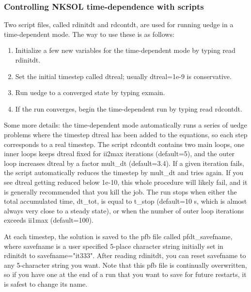 \documentclass [12pt]{article}
\begin{document}
\subsubsection{Controlling NKSOL time-dependence with scripts}
Two script files, called {\sf rdinitdt} and {\sf rdcontdt}, are used for 
running uedge in a time-dependent mode.  The way to use these is as follows:
%
\begin{enumerate}
 \item Initialize a few new variables for the time-dependent mode by typing 
       {\sf read rdinitdt}.
 \item Set the initial timestep called {\sf dtreal}; usually {\sf dtreal=1e-9}
       is conservative.
 \item Run uedge to a converged state by typing {\sf exmain}.
 \item If the run converges, begin the time-dependent run by typing 
       {\sf read rdcontdt}.
\end{enumerate}

Some more details: the time-dependent mode automatically runs a series of
uedge problems where the timestep {\sf dtreal} has been added to the
equations, so each step corresponds to a real timestep.  The script {\sf
  rdcontdt} contains two main loops, one inner loops keeps {\sf dtreal} fixed
for {\sf ii2max} iterations (default=5), and the outer loop increases {\sf
  dtreal} by a factor {\sf mult\_dt} (default=3.4).  If a given iteration
fails, the script automatically reduces the timestep by {\sf mult\_dt} and
tries again.  If you see {\sf dtreal} getting reduced below 1e-10, this whole
procedure will likely fail, and it is generally recommended that you kill the
job.  The run stops when either the total accumulated time, {\sf dt\_tot}, is
equal to {\sf t\_stop} (default=10 s, which is almost always very close to a
steady state), or when the number of outer loop iterations exceeds {\sf
  ii1max} (default=100).

At each timestep, the solution is saved to the pfb file called {\sf
  pfdt\_savefname}, where savefname is a user specified 5-place character
string initially set in {\sf rdinitdt} to {\sf savefname="it333"}.  After
reading {\sf rdinitdt}, you can reset savefname to any 5-character string you
want.  Note that this pfb file is continually overwritten, so if you have one
at the end of a run that you want to save for future restarts, it is safest to
change its name.
\end{document}
